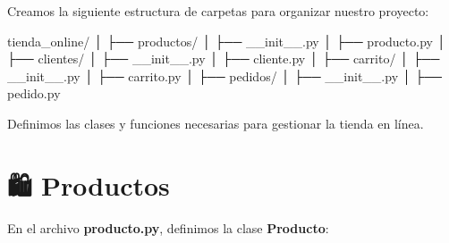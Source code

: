 \documentclass[
  a4paper,
  DIV=11,
  numbers=noendperiod,
  onepage,
  openany]{scrreprt}
\newenvironment{Shaded}{\begin{snugshade}}{\end{snugshade}}
\newcommand{\CommentTok}[1]{\textcolor[rgb]{0.37,0.37,0.37}{#1}}
\newcommand{\ControlFlowTok}[1]{\textcolor[rgb]{0.00,0.23,0.31}{#1}}
\newcommand{\FunctionTok}[1]{\textcolor[rgb]{0.28,0.35,0.67}{#1}}
\newcommand{\KeywordTok}[1]{\textcolor[rgb]{0.00,0.23,0.31}{#1}}
\newcommand{\NormalTok}[1]{\textcolor[rgb]{0.00,0.23,0.31}{#1}}
\newcommand{\OperatorTok}[1]{\textcolor[rgb]{0.37,0.37,0.37}{#1}}
\newcommand{\SpecialCharTok}[1]{\textcolor[rgb]{0.37,0.37,0.37}{#1}}
\newcommand{\SpecialStringTok}[1]{\textcolor[rgb]{0.13,0.47,0.30}{#1}}
\newcommand{\VariableTok}[1]{\textcolor[rgb]{0.07,0.07,0.07}{#1}}
\begin{document}
Creamos la siguiente estructura de carpetas para organizar nuestro
proyecto:

\begin{Shaded}
\begin{Highlighting}[]
\NormalTok{tienda\_online/}
\NormalTok{│}
\NormalTok{├── productos/}
\NormalTok{│   ├── \_\_init\_\_.py}
\NormalTok{│   ├── producto.py}
\NormalTok{│}
\NormalTok{├── clientes/}
\NormalTok{│   ├── \_\_init\_\_.py}
\NormalTok{│   ├── cliente.py}
\NormalTok{│}
\NormalTok{├── carrito/}
\NormalTok{│   ├── \_\_init\_\_.py}
\NormalTok{│   ├── carrito.py}
\NormalTok{│}
\NormalTok{├── pedidos/}
\NormalTok{│   ├── \_\_init\_\_.py}
\NormalTok{│   ├── pedido.py}
\end{Highlighting}
\end{Shaded}

Definimos las clases y funciones necesarias para gestionar la tienda en
línea.

\section{🛍️ Productos}\label{productos}

En el archivo \textbf{producto.py}, definimos la clase
\textbf{Producto}:

\begin{Shaded}
\end{Shaded}
\end{document}

